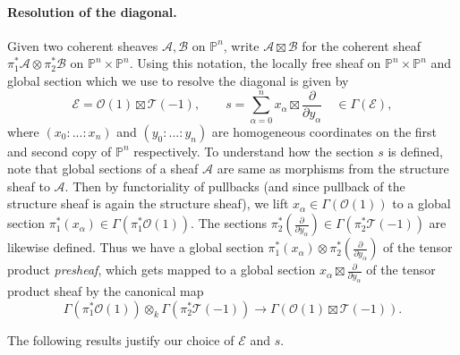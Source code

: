 \documentclass[a4paper]{article}
\theoremstyle{definition}
\theoremstyle{remark}
\newcommand{\Pn}{\ensuremath{{\mathbb{P}^n}}}
\begin{document}
\paragraph{Resolution of the diagonal.} Given two coherent sheaves
\(\mathscr{A},\mathscr{B}\) on \(\Pn\), write \(\mathscr{A}\boxtimes
\mathscr{B}\) for the coherent sheaf \(\pi_1^\ast\mathscr{A}\otimes
\pi_2^\ast\mathscr{B}\) on \(\Pn \times \Pn\). Using this notation, the locally
free sheaf on \(\Pn\times \Pn\) and global section which we use to resolve the
diagonal is given by 
\[\mathscr{E}=\mathscr{O}(1)\boxtimes  \mathscr{T}(-1), \qquad
s=\sum_{\alpha=0}^n x_\alpha\boxtimes \frac{\partial}{\partial y_\alpha}\quad\in
\Gamma(\mathscr{E}),\] 
where \((x_0:...:x_n)\) and \((y_0:...:y_n)\) are homogeneous coordinates on the
first and second copy of \(\Pn\) respectively. To understand how the section
\(s\) is defined, note that global sections of a sheaf \(\mathscr{A}\) are same
as morphisms from the structure sheaf to \(\mathscr{A}\). Then by functoriality of
pullbacks (and since pullback of the structure sheaf is again the structure
sheaf), we lift \(x_\alpha\in \Gamma(\mathscr{O}(1))\) to a global section
\(\pi_1^\ast(x_\alpha)\in \Gamma(\pi_1^\ast \mathscr{O}(1))\). The sections
\(\pi_2^\ast(\frac{\partial}{\partial y_\alpha})\in \Gamma(\pi_2^\ast
\mathscr{T}(-1))\) are likewise defined. Thus we have a global section
\(\pi_1^\ast(x_\alpha)\otimes \pi_2^\ast(\frac{\partial}{\partial y_\alpha})\)
of the tensor product \textit{presheaf}, which gets mapped to a global section
\(x_\alpha \boxtimes \frac{\partial}{\partial y_\alpha}\) of the tensor product
sheaf by the canonical map 
\[\Gamma(\pi_1^\ast\mathscr{O}(1))\otimes_k \Gamma(\pi_2^\ast
\mathscr{T}(-1))\rightarrow \Gamma(\mathscr{O}(1)\boxtimes \mathscr{T}(-1)).\]

The following results justify our choice of \(\mathscr{E}\) and \(s\).
\end{document}
